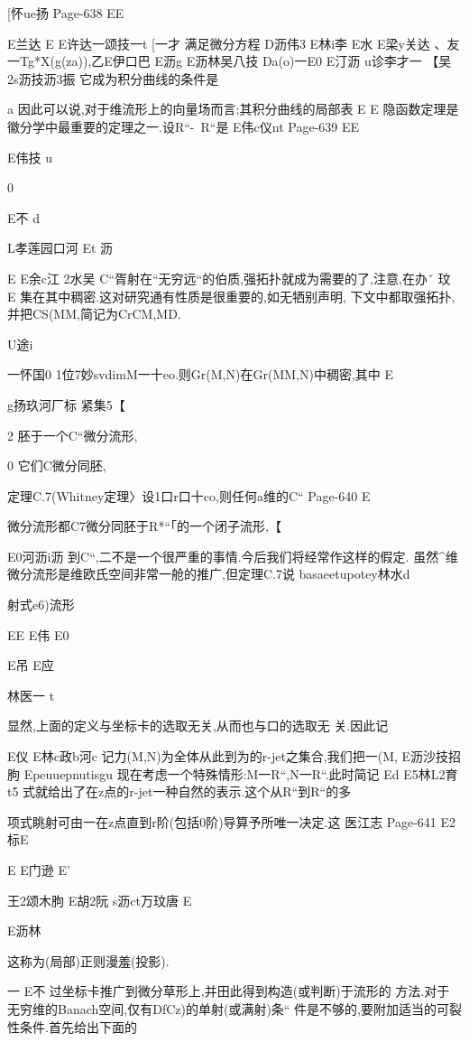 [怀ue扬
Page-638
EE

E兰达
E
E许达一颂技一t
[一才
满足微分方程
D沥伟3
E林i李
E水
E梁y关达
、友一Tg*X(g(za)),乙E伊口巴
E沥g
E沥林吴八技
Da(o)一E0
E汀沥
u诊李才一
【吴2s沥技沥3振
它成为积分曲线的条件是

a
因此可以说,对于维流形上的向量场而言;其积分曲线的局部表
E
E
隐函数定理是徽分学中最重要的定理之一.设R“-~R“是
E伟c仪nt
Page-639
EE

E伟技
u

0

E不
d

L孝莲园口河
Et
沥

E
E余c江
2水吴
C“胥射在“无穷远“的伯质,强拓扑就成为需要的了,注意,在办ˇ
玟
E
集在其中稠密.这对研究通有性质是很重要的,如无牺别声明,
下文中都取强拓扑,并把CS(MM,简记为CrCM,MD.

U途i

一怀国0
1位7妙svdimM一十eo.则Gr(M,N)在Gr(MM,N)中稠密,其中
E

g扬玖河厂标
紧集5【

2
胚于一个C“微分流形,

0
它们C微分同胚,

定理C.7(Whitney定理〉设1口r口十co,则任何a维的C“
Page-640
E

微分流形都C7微分同胚于R*“「的一个闭子流形,【

E0河沥i沥
到C“,二不是一个很严重的事情.今后我们将经常作这样的假定.
虽然^维微分流形是维欧氏空间非常一舱的推广,但定理C.7说
basaeetupotey林水d

射式e6)流形

EE
E伟
E0

E吊
E应

林医一
t

显然,上面的定义与坐标卡的选取无关,从而也与口的选取无
关.因此记

E仪
E林c政b河c
记力(M,N)为全体从此到为的r-jet之集合,我们把一(M,
E沥沙技招朐
Epeuuepnutisgu
现在考虑一个特殊情形:M一R“,N一R“.此时简记
Ed
E5林L2育t5
式就给出了在z点的r-jet一种自然的表示.这个从R“到R“的多

项式眺射可由一在z点直到r阶(包括0阶)导算予所唯一决定.这
医江志
Page-641
E2标E

E
E门逊
E'

王2颂木朐
E胡2阮
s沥ct万玟唐
E

E沥林

这称为(局部)正则漫羞(投影).

一
E不
过坐标卡推广到微分草形上,并田此得到构造(或判断)于流形的
方法.对于无穷维的Banach空间,仅有DfCz)的单射(或满射)条“
件是不够的,要附加适当的可裂性条件.首先给出下面的

